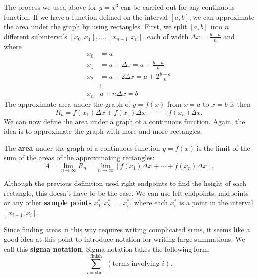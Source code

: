 \documentclass[10pt,]{book}
\newcommand{\terminology}[1]{\textbf{#1}}
\theoremstyle{ptxplainnotitle}
\theoremstyle{ptxplaintitle}
\theoremstyle{ptxplainnotitle}
\theoremstyle{ptxplaintitle}
\theoremstyle{ptxplainnotitle}
\theoremstyle{ptxplaintitle}
\theoremstyle{ptxdefinitionnotitle}
\theoremstyle{ptxdefinitiontitle}
\theoremstyle{ptxdefinitionnotitle}
\theoremstyle{ptxdefinitiontitle}
\theoremstyle{ptxdefinitionnotitle}
\theoremstyle{ptxdefinitiontitle}
\theoremstyle{ptxdefinitionnotitle}
\theoremstyle{ptxdefinitiontitle}
\theoremstyle{ptxdefinitionnotitle}
\theoremstyle{ptxdefinitiontitle}
\numberwithin{equation}{section}
\begin{document}
\par
\hypertarget{p-407}{}%
The process we used above for \(y = x^{3}\) can be carried out for any continuous function. If we have a function defined on the interval \([a,b]\), we can approximate the area under the graph by using rectangles. First, we split \([a,b]\) into \(n\) different subintervals \([x_{0},x_{1}],\ldots,[x_{n-1},x_{n}]\), each of width \(\Delta x = \frac{b-a}{n}\) and where%
\begin{align*}
x_{0} & = a \\
x_{1} & = a + \Delta x = a+\frac{b-a}{n} \\
x_{2} & = a + 2\Delta x = a + 2\frac{b-a}{n}\\
& \vdots \\
x_{n} & a+n\Delta x = b
\end{align*}
The approximate area under the graph of \(y=f(x)\) from \(x=a\) to \(x=b\) is then%
\begin{equation*}
R_{n} = f(x_{1})\Delta x + f(x_{2})\Delta x + \cdots + f(x_{n})\Delta x.
\end{equation*}
We can now define the area under a graph of a continuous function. Again, the idea is to approximate the graph with more and more rectangles.%
\begin{definition}[{Area.}]\label{definition-area}
\hypertarget{p-408}{}%
The \terminology{area} under the graph of a continuous function \(y=f(x)\) is the limit of the sum of the areas of the approximating rectangles:%
\begin{equation*}
A = \lim_{n\to\infty}R_{n} = \lim_{n\to\infty}[f(x_{1})\Delta x + \cdots + f(x_{n})\Delta x].
\end{equation*}
%
\end{definition}
\hypertarget{p-409}{}%
Although the previous definition used right endpoints to find the height of each rectangle, this doesn't have to be the case. We can use left endpoints, midpoints or any other \terminology{sample points} \(x_{1}^{*}, x_{2}^{*},\ldots,x_{n}^{*}\), where each \(x_{i}^{*}\) is a point in the interval \([x_{i-1},x_{i}].\)%
\par
\hypertarget{p-410}{}%
Since finding areas in this way requires writing complicated sums, it seems like a good idea at this point to introduce notation for writing large summations. We call this \terminology{sigma notation}. Sigma notation takes the following form:%
\begin{equation*}
\sum_{i=\text{start}}^{\text{finish}}(\text{terms involving }i).
\end{equation*}
\end{document}
